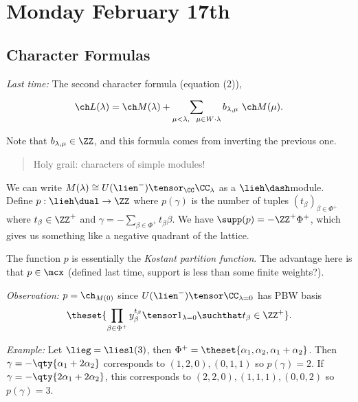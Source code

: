 \hypertarget{monday-february-17th}{%
\section{Monday February 17th}\label{monday-february-17th}}

\hypertarget{character-formulas}{%
\subsection{Character Formulas}\label{character-formulas}}

\emph{Last time:} The second character formula (equation (2)),

\begin{align*}
\ch L(\lambda) =  \ch M(\lambda) + \sum_{\mu < \lambda, ~~ \mu \in W\cdot \lambda} b_{\lambda, \mu} ~\ch M(\mu)
.\end{align*}

Note that \(b_{\lambda, \mu} \in \ZZ\), and this formula comes from
inverting the previous one.

\begin{quote}
Holy grail: characters of simple modules!
\end{quote}

We can write \(M(\lambda) \cong U(\lien^-) \tensor_\CC \CC_\lambda\) as
a \(\lieh\dash\)module. Define \(p: \lieh\dual \to \ZZ\) where
\(p(\gamma)\) is the number of tuples \((t_\beta)_{\beta\in\Phi^+}\)
where \(t_\beta \in \ZZ^+\) and
\(\gamma = - \sum_{\beta \in \Phi^+} t_\beta \beta\). We have
\(\supp(p) = - \ZZ^+ \Phi^+\), which gives us something like a negative
quadrant of the lattice.

The function \(p\) is essentially the \emph{Kostant partition function}.
The advantage here is that \(p \in \mcx\) (defined last time, support is
less than some finite weights?).

\emph{Observation:} \(p = \ch_{M(0)}\) since
\(U(\lien^-) \tensor \CC_{\lambda = 0}\) has PBW basis
\begin{align*}
\theset{ \prod_{\beta\in\Phi^+} y_\beta^{t_\beta} \tensor 1_{\lambda = 0} \suchthat t_\beta \in \ZZ^+ }.
\end{align*}

\emph{Example:} Let \(\lieg = \liesl(3)\), then
\(\Phi^+ = \theset{\alpha_1, \alpha_2, \alpha_1 + \alpha_2}\). Then
\(\gamma = -\qty{\alpha_1 + 2\alpha_2}\) corresponds to
\((1,2,0), (0,1,1)\) so \(p(\gamma) = 2\). If
\(\gamma = -\qty{2\alpha_1 + 2\alpha_2}\), this corresponds to
\((2,2,0), (1,1,1), (0,0,2)\) so \(p(\gamma) = 3\).


